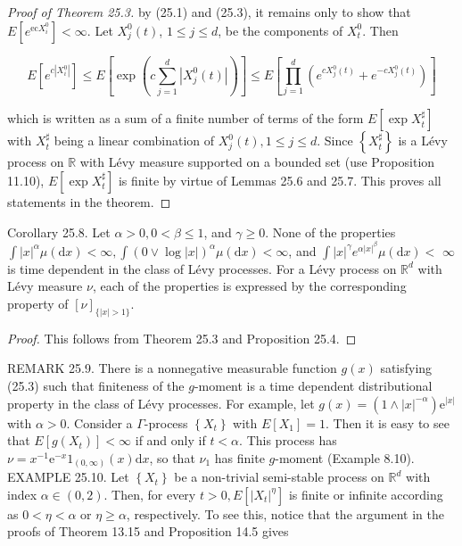 \documentclass[a4paper,11pt]{article}
\begin{document}
\begin{proof}[Proof of Theorem 25.3]
    by (25.1) and (25.3), it remains only to show that $E\left[e^{\mathrm{ec} X_{i}^{0}}\right]<\infty$.
    Let $X_{j}^{0}(t)$, $1 \leq j \leq d$, be the components of $X_{t}^{0}$. Then

    $$
        E\left[e^{c\left|X_{i}^{0}\right|}\right] \leq E\left[\exp \left(c \sum_{j=1}^{d}\left|X_{j}^{0}(t)\right|\right)\right] \leq E\left[\prod_{j=1}^{d}\left(e^{c X_{j}^{0}(t)}+e^{-c X_{j}^{0}(t)}\right)\right]
    $$

    which is written as a sum of a finite number of terms of the form $E\left[\exp X_{t}^{\sharp}\right]$
    with $X_{t}^{\sharp}$ being a linear combination of $X_{j}^{0}(t), 1 \leq j \leq d$. Since $\left\{X_{t}^{\sharp}\right\}$
    is a Lévy process on $\mathbb{R}$ with Lévy measure supported on a bounded set (use Proposition 11.10),
    $E\left[\exp X_{t}^{\sharp}\right]$ is finite by virtue of Lemmas 25.6 and 25.7. This proves all statements in the theorem.

\end{proof}

Corollary 25.8. Let $\alpha>0,0<\beta \leq 1$, and $\gamma \geq 0$. None of the properties
$\int|x|^{\alpha} \mu(\mathrm{d} x)<\infty, \int(0 \vee \log |x|)^{\alpha} \mu(\mathrm{d} x)<\infty$, and
$\int|x|^{\gamma} e^{\alpha|x|^{\beta}} \mu(\mathrm{d} x)<$ $\infty$ is time dependent in the class
of Lévy processes. For a Lévy process on $\mathbb{R}^{d}$ with Lévy measure $\nu$, each of the properties
is expressed by the corresponding property of $[\nu]_{\{|x|>1\}}$.

\begin{proof}
    This follows from Theorem 25.3 and Proposition 25.4.
\end{proof}

REMARK 25.9. There is a nonnegative measurable function $g(x)$ satisfying (25.3) such that finiteness of the $g$-moment is a
time dependent distributional property in the class of Lévy processes. For example, let $g(x)=\left(1 \wedge|x|^{-\alpha}\right)
    \mathrm{e}^{|x|}$ with $\alpha>0$. Consider a $\Gamma$-process $\left\{X_{t}\right\}$ with $E[X_{1}]=1$. Then it is easy to see
that $E\left[g\left(X_{t}\right)\right]<\infty$ if and only if $t<\alpha$. This process has
$\nu=x^{-1} \mathrm{e}^{-x} 1_{(0, \infty)}(x) \mathrm{d} x$, so that $\nu_{1}$ has finite $g$-moment (Example 8.10). \\

EXAMPLE 25.10. Let $\left\{X_{t}\right\}$ be a non-trivial semi-stable process on $\mathbb{R}^{d}$ with index
$\alpha \in(0,2)$. Then, for every $t>0, E\left[\left|X_{t}\right|^{\eta}\right]$ is finite or infinite
according as $0<\eta<\alpha$ or $\eta \geq \alpha$, respectively. To see this, notice that the argument
in the proofs of Theorem 13.15 and Proposition 14.5 gives
\end{document}
